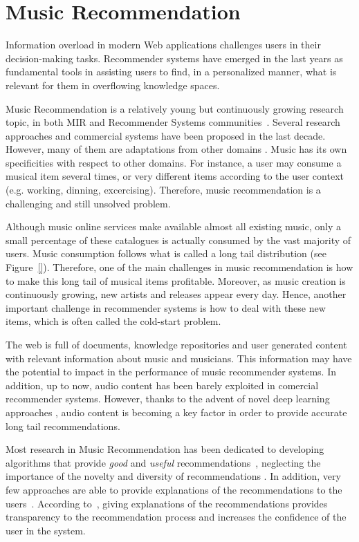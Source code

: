 \section{Music Recommendation}
\label{sec:intro:recommendation}

Information overload in modern Web applications challenges users in their decision-making tasks. Recommender systems have emerged in the last years as fundamental tools in assisting users to find, in a personalized manner, what is relevant for them in overflowing knowledge spaces. 

Music Recommendation is a relatively young but continuously growing research topic, in both MIR and Recommender Systems communities~\cite{oscarBook}. Several research approaches and commercial systems have been proposed in the last decade. However, many of them are adaptations from other domains \cite{oscarBook}. 
Music has its own specificities with respect to other domains. For instance, a user may consume a musical item several times, or very different items according to the user context (e.g. working, dinning, excercising). Therefore, music recommendation is a challenging and still unsolved problem.

Although music online services make available almost all existing music, only a small percentage of these catalogues is actually consumed by the vast majority of users. Music consumption follows what is called a long tail distribution \cite{oscarBook} (see Figure~\ref{}). Therefore, one of the main challenges in music recommendation is how to make this long tail of musical items profitable. Moreover, as music creation is continuously growing, new artists and releases appear every day. Hence, another important challenge in recommender systems is how to deal with these new items, which is often called the cold-start problem.

The web is full of documents, knowledge repositories and user generated content with relevant information about music and musicians. This information may have the potential to impact in the performance of music recommender systems. In addition, up to now, audio content has been barely exploited in comercial recommender systems. However, thanks to the advent of novel deep learning approaches \cite{Oord2013}, audio content is becoming a key factor in order to provide accurate long tail recommendations.

Most research in Music Recommendation has been dedicated to developing algorithms that provide \textit{good} and \textit{useful} recommendations~\cite{oscarBook}, neglecting the importance of the novelty and diversity of recommendations \cite{adomavicius2012improving,Bellogin2010}. In addition, very few approaches are able to provide explanations of the recommendations to the users~\cite{Passant2008, Passant2010}. According to~\cite{celma2008new}, giving explanations of the recommendations provides transparency to the recommendation process and increases the confidence of the user in the system.

